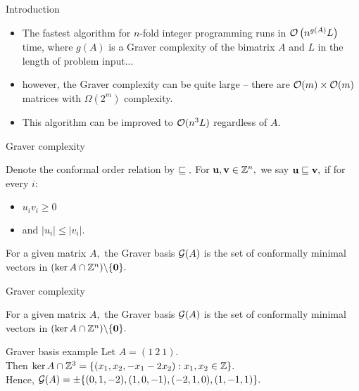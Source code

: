 \documentclass[handout,usenames,dvipsnames]{beamer}
\begin{document}
\begin{frame}{Introduction}
    \begin{itemize}
        \item<1-> The fastest algorithm for $n$-fold integer programming runs in $\mathcal{O} \left(n^{g(A)}L\right)$ time, where $g(A)$ is a Graver complexity of the bimatrix $A$ and $L$ in the length of problem input...
        \item<2-> however, the Graver complexity can be quite large -- there are $\mathcal{O}(m)\times \mathcal{O}(m)$ matrices with $\Omega(2^m)$ complexity.
        \item<3-> This algorithm can be improved to $\mathcal{O}(n^3L)$ regardless of $A.$
    \end{itemize}
\end{frame}

\begin{frame}{Graver complexity}
    \begin{defi}
        Denote the conformal order relation by $\sqsubseteq.$ For $\textbf{u}, \textbf{v} \in \mathbb{Z}^n,$ we say $\textbf{u} \sqsubseteq \textbf{v},$ if for every $i:$
        \begin{itemize}
            \item<1-> $u_iv_i \geqslant 0$
            \item<2-> and $|u_i| \leqslant |v_i|.$
        \end{itemize}
    \end{defi}
    \pause
    \begin{defi}
        For a given matrix $A,$ the Graver basis $\mathcal{G}(A)$ is the set of conformally minimal vectors in $(\ker A \cap \mathbb{Z}^n)\backslash \{\textbf{0}\}.$
    \end{defi}
\end{frame}

\begin{frame}{Graver complexity}
    \begin{defi*}
        For a given matrix $A,$ the Graver basis $\mathcal{G}(A)$ is the set of conformally minimal vectors in $(\ker A \cap \mathbb{Z}^n)\backslash \{\textbf{0}\}.$
    \end{defi*}
    \begin{exampleblock}{Graver basis example}
        Let $A = (1 \ 2 \ 1).$ \\
        \pause
        Then $\ker A \cap \mathbb{Z}^3 = \{(x_1, x_2, -x_1-2x_2): x_1, x_2 \in \mathbb{Z}\}.$ \\
        \pause
        Hence, $\mathcal{G}(A) = \pm \{(0,1,-2), (1,0,-1), (-2,1,0), (1,-1,1)\}.$
    \end{exampleblock}
\end{frame}
\end{document}
